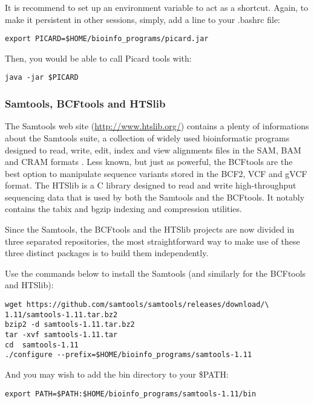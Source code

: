 It is recommend to set up an environment variable to act as a shortcut. Again, to make it persistent in other sessions, simply, add a line to your .bashrc file:

\begin{verbatim}
export PICARD=$HOME/bioinfo_programs/picard.jar
\end{verbatim}

Then, you would be able to call Picard tools with:

\begin{verbatim}
java -jar $PICARD
\end{verbatim}


\subsubsection{Samtools, BCFtools and HTSlib}


The Samtools web site (\href{http://www.htslib.org/}{http://www.htslib.org/}) contains a plenty of informations about the Samtools suite, a collection of widely used bioinformatic programs designed to read, write, edit, index and view alignments files in the SAM, BAM and CRAM formats \cite{Danecek2021}. Less known, but just as powerful, the BCFtools are the best option to manipulate sequence variants stored in the BCF2, VCF and gVCF format. The HTSlib is a C library designed to read and write high-throughput sequencing data that is used by both the Samtools and the BCFtools. It notably contains the tabix and bgzip indexing and compression utilities.

Since the Samtools, the BCFtools and the HTSlib projects are now divided in three separated repositories, the most straightforward way to make use of these three distinct packages is to build them independently. 

Use the commands below to install the Samtools (and similarly for the BCFtools and HTSlib):

\begin{verbatim}
wget https://github.com/samtools/samtools/releases/download/\
1.11/samtools-1.11.tar.bz2
bzip2 -d samtools-1.11.tar.bz2	
tar -xvf samtools-1.11.tar
cd  samtools-1.11
./configure --prefix=$HOME/bioinfo_programs/samtools-1.11
\end{verbatim}

And you may wish to add the bin directory to your \$PATH:

\begin{verbatim}
export PATH=$PATH:$HOME/bioinfo_programs/samtools-1.11/bin
\end{verbatim}

